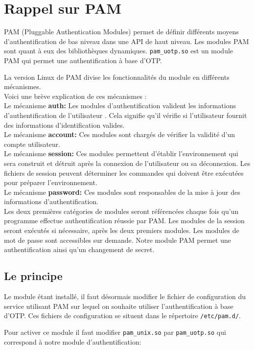 \documentclass{"../../../res/univ-projet"}
\begin{document}
\section{Rappel sur PAM}
PAM (Pluggable Authentication Modules) permet de définir différents moyens
d'authentification de bas niveau dans une API de haut niveau.
Les modules PAM sont quant à eux des bibliothèques dynamiques. \verb?pam_uotp.so?
est un module PAM qui permet une authentification à base d'OTP.

La version Linux de PAM divise les fonctionnalités du module en différents mécanismes.\\
Voici une brève explication de ces mécanismes :\\
Le mécanisme \textbf{auth:} Les modules d'authentification valident les informations d'authentification de l'utilisateur . Cela signifie qu'il vérifie si l'utilisateur fournit des informations d'identification valides.\\
Le mécanisme \textbf{account:} Ces modules sont chargés de vérifier la validité d'un compte utilisateur.\\
Le mécanisme \textbf{session:} Ces modules permettent d'établir l'environnement qui sera construit et détruit après la connexion de l'utilisateur ou sa déconnexion. Les fichiers de session peuvent déterminer les commandes qui doivent être exécutées pour préparer l'environnement.\\
Le mécanisme \textbf{password:} Ces modules sont responsables de la mise à jour des informations d'authentification.\\
Les deux premières catégories de modules seront référencées chaque fois qu'un programme effectue authentification réussie par PAM.
Les modules de la session seront exécutés si nécessaire, après les deux premiers modules. Les modules de mot de passe sont accessibles sur demande. Notre module PAM permet une authentification ainsi qu'un changement de secret.

\newpage

\subsection{Le principe}
Le module étant installé, il faut désormais modifier le fichier de 
configuration du service utilisant PAM sur lequel on souhaite utiliser 
l'authentification à base d'OTP. Ces fichiers de configuration se situent 
dans le répertoire \verb?/etc/pam.d/?.

Pour activer ce module il faut modifier \verb?pam_unix.so? par \verb?pam_uotp.so?  
qui correspond à notre module d'authentification:
\end{document}
